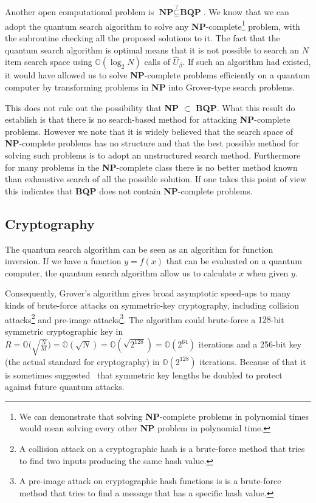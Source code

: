 Another open computational problem is $\textbf{NP} \stackrel{?}{\subseteq} \textbf{BQP}$.
We know that we can adopt the quantum search algorithm to solve any \textbf{NP}-complete\footnote{We can demonstrate that solving \textbf{NP}-complete problems in polynomial times would mean solving every other \textbf{NP} problem in polynomial time.} problem, with the subroutine checking all the proposed solutions to it.
The fact that the quantum search algorithm is optimal means that it is not possible to search an $N$ item search space using $\mathbb{O}(\log_2{N})$ calls of $\hat{U}_\beta$. If such an algorithm had existed, it would have allowed us to solve \textbf{NP}-complete problems efficiently on a quantum computer by transforming problems in \textbf{NP} into Grover-type search problems.

This does not rule out the possibility that \textbf{NP} $\subset$ \textbf{BQP}. What this result do establish is that there is no search-based method for attacking \textbf{NP}-complete problems.
However we note that it is widely believed that the search space of \textbf{NP}-complete problems has no structure and that the best possible method for solving such problems is to adopt an unstructured search method. Furthermore for many problems in the \textbf{NP}-complete class there is no better method known than exhaustive search of all the possible solution. If one takes this point of view this indicates that \textbf{BQP} does not contain \textbf{NP}-complete problems.

\subsection{Cryptography}
The quantum search algorithm can be seen as an algorithm for function inversion. If we have a function $y=f(x)$ that can be evaluated on a quantum computer, the quantum search algorithm allow us to calculate $x$ when given $y$.

Consequently, Grover's algorithm gives broad asymptotic speed-ups to many kinds of brute-force attacks on symmetric-key cryptography, including collision attacks\footnote{A collision attack on a cryptographic hash is a brute-force method that tries to find two inputs producing the same hash value.} and pre-image attacks\footnote{A pre-image attack on cryptographic hash functions is is a brute-force method that tries to find a message that has a specific hash value.}.
The algorithm could brute-force a $128$-bit symmetric cryptographic key in $R = \mathbb{O} \biggl(\sqrt{\frac{N}{M}}\biggr) = \mathbb{O} (\sqrt{N}) = \mathbb{O} (\sqrt{2^{128}}) = \mathbb{O} (2^{64})$ iterations and a 256-bit key (the actual standard for cryptography) in $\mathbb{O} (2^{128})$ iterations. Because of that  it is sometimes suggested~\cite{10.1007/978-3-642-12929-2_6} that symmetric key lengths be doubled to protect against future quantum attacks.
